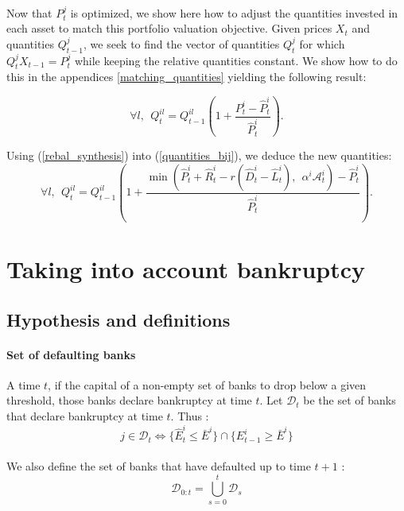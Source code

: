 \documentclass{article}
\newcommand{\wh}{\widehat}
\begin{document}
\paragraph{}
Now that $P_t^{j}$ is optimized, we show here how to adjust the quantities invested in each asset to match this portfolio valuation objective. Given prices $X_t$ and quantities $Q_{t-1}^j$, we seek to find the vector of quantities $Q_t^{j}$ for which $Q_t^{j}X_{t-1} = P_t^{j}$ while keeping the relative quantities constant. We show how to do this in the appendices \ref{matching_quantities} yielding the following result: 

\begin{equation}\label{quantities_bij}
\forall l,~~ Q_t^{il} = Q_{t-1}^{il}\left(1 + \frac{P_t^i - \widehat{P}_t^i}{\widehat{P}_t^i} \right).
\end{equation}



Using (\ref{rebal_synthesis}) into (\ref{quantities_bij}), we deduce the new quantities:
\begin{equation}\label{eq:rebal_quantities}
\forall l,~~ Q_t^{il} = Q_{t-1}^{il}\left(1 + \frac{\min(\widehat{P}_t^i + \widehat{R}_t^i - r(\wh D_t^i - \wh L_t^i),~~\alpha^i \mathcal{A}_t^i) - \widehat{P}_t^i}{\widehat{P}_t^i} \right).
\end{equation}


\section{Taking into account bankruptcy}\label{dynamic with bankruptcy}

\subsection{Hypothesis and definitions}

\paragraph{Set of defaulting banks}
A time $t$, if the capital of a non-empty set of banks to drop below a given threshold, those banks declare bankruptcy at time $t$. Let $\mathcal{D}_t$ be the set of banks that declare bankruptcy at time $t$. Thus : $$j \in \mathcal{D}_{t} \Leftrightarrow \{ \widehat{E}_{t}^i \leq \bar{E}^i \} \cap \{ E_{t-1}^i \geq \bar{E}^i \} $$

\paragraph{}    
We also define the set of banks that have defaulted up to time $t+1$ :
$$\mathcal{D}_{0:t} = \bigcup_{s=0}^{t} \mathcal{D}_s $$
\end{document}
